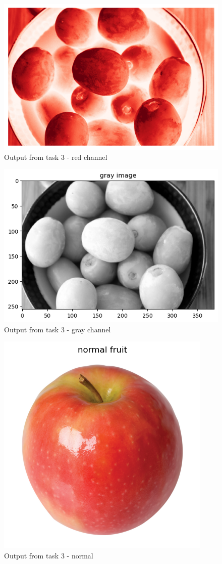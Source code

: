 \documentclass[conference]{IEEEtran} %
\begin{document}
\begin{figure}[H]
    \centering
    \includegraphics[width=0.5\linewidth]{Task3Output/red1.png}
    \caption{Output from task 3 - red channel}
    \label{fig:red1}
\end{figure}

\begin{figure}[H]
    \centering
    \includegraphics[width=0.5\linewidth]{Task3Output/gray1.png}
    \caption{Output from task 3 - gray channel}
    \label{fig:gray1}
\end{figure}

\begin{figure}[H]
    \centering
    \includegraphics[width=0.5\linewidth]{Task3Output/normalfruit2.png}
    \caption{Output from task 3 - normal}
    \label{fig:normal2}
\end{figure}
\end{document}
